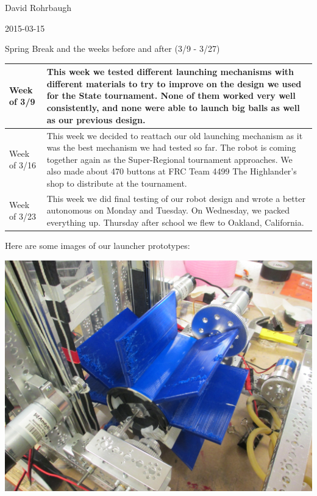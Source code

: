 David Rohrbaugh

2015-03-15

Spring Break and the weeks before and after (3/9 - 3/27)

\begin{tabular}{|p{5cm}|p{5cm}|}
 \hline
 Week of 3/9&
 This week we tested different launching mechanisms with different materials to try to improve on the design we used for the State tournament. None of them worked very well consistently, and none were able to launch big balls as well as our previous design.\\
\hline
 Week of 3/16&
 This week we decided to reattach our old launching mechanism as it was the best mechanism we had tested so far. The robot is coming together again as the Super-Regional tournament approaches. We also made about 470 buttons at FRC Team 4499 The Highlander's shop to distribute at the tournament.\\
\hline
 Week of 3/23&
 This week we did final testing of our robot design and wrote a better autonomous on Monday and Tuesday. On Wednesday, we packed everything up. Thursday after school we flew to Oakland, California.\\
 \hline
\end{tabular}

\medskip

\pagebreak

Here are some images of our launcher prototypes:

\begin{center}
 \includegraphics[width=\textwidth]{./Entries/Images/launchProto7.JPG}
\end{center}

